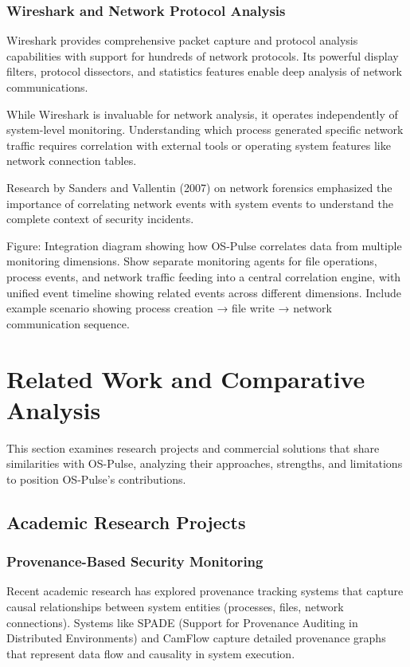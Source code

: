 \subsubsection{Wireshark and Network Protocol Analysis}
Wireshark provides comprehensive packet capture and protocol analysis capabilities with support for hundreds of network protocols. Its powerful display filters, protocol dissectors, and statistics features enable deep analysis of network communications.

While Wireshark is invaluable for network analysis, it operates independently of system-level monitoring. Understanding which process generated specific network traffic requires correlation with external tools or operating system features like network connection tables.

Research by Sanders and Vallentin (2007) on network forensics emphasized the importance of correlating network events with system events to understand the complete context of security incidents.

{{Figure: Integration diagram showing how OS-Pulse correlates data from multiple monitoring dimensions. Show separate monitoring agents for file operations, process events, and network traffic feeding into a central correlation engine, with unified event timeline showing related events across different dimensions. Include example scenario showing process creation → file write → network communication sequence.}}

\section{Related Work and Comparative Analysis}

This section examines research projects and commercial solutions that share similarities with OS-Pulse, analyzing their approaches, strengths, and limitations to position OS-Pulse's contributions.

\subsection{Academic Research Projects}

\subsubsection{Provenance-Based Security Monitoring}
Recent academic research has explored provenance tracking systems that capture causal relationships between system entities (processes, files, network connections). Systems like SPADE (Support for Provenance Auditing in Distributed Environments) and CamFlow capture detailed provenance graphs that represent data flow and causality in system execution.

